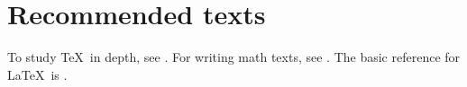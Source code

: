 \documentclass{scrartcl}
\begin{document}
	\section*{Recommended texts}
	To study \TeX\ in depth, see \autocite{DK86}. For
	writing math texts, see \autocite{DK89}. The
	basic reference for \LaTeX\ is \autocite{Lamport}.
	\printbibliography
\end{document}
